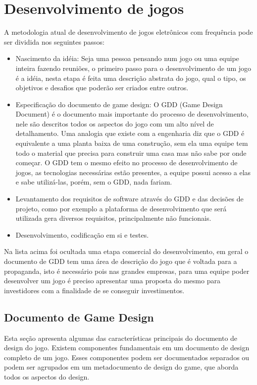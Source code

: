 \section{Desenvolvimento de jogos}
A metodologia atual de desenvolvimento de jogos eletrônicos com frequência pode ser dividida nos seguintes passos:
\begin{itemize}
\item Nascimento da idéia: Seja uma pessoa pensando num jogo ou uma equipe inteira fazendo reuniões, o primeiro passo para o desenvolvimento de um jogo é a idéia, nesta etapa é feita uma descrição abstrata do jogo, qual o tipo, os objetivos e desafios que poderão ser criados entre outros.
\item Especificação do documento de game design: O GDD (Game Design Document) é o documento mais importante do processo de desenvolvimento, nele são descritos todos os aspectos do jogo com um alto nível de detalhamento. Uma analogia que existe com a engenharia diz que o GDD é equivalente a uma planta baixa de uma construção, sem ela uma equipe tem todo o material que precisa para construir uma casa mas não sabe por onde começar. O GDD tem o mesmo efeito no processo de desenvolvimento de jogos, as tecnologias necessárias estão presentes, a equipe possui acesso a elas e sabe utilizá-las, porém, sem o GDD, nada fariam.
\item Levantamento dos requisitos de software através do GDD e das decisões de projeto, como por exemplo a plataforma de desenvolvimento que será utilizada gera diversos requisitos, principalmente não funcionais.
\item Desenvolvimento, codificação em si e testes.
\end{itemize}

Na lista acima foi ocultada uma etapa comercial do desenvolvimento, em geral o documento de GDD tem uma área de descrição do jogo que é voltada para a propaganda, isto é necessário pois nas grandes empresas, para uma equipe poder desenvolver um jogo é preciso apresentar uma proposta do mesmo para investidores com a finalidade de se conseguir investimentos.


\subsection{Documento de Game Design}
Esta seção apresenta algumas das características principais do documento de design do jogo. Existem componentes fundamentais em um documento de design completo de um jogo. Esses componentes podem ser documentados separados ou podem ser agrupados em um metadocumento de design do game, que aborda todos os aspectos do design. \cite{design_games}


